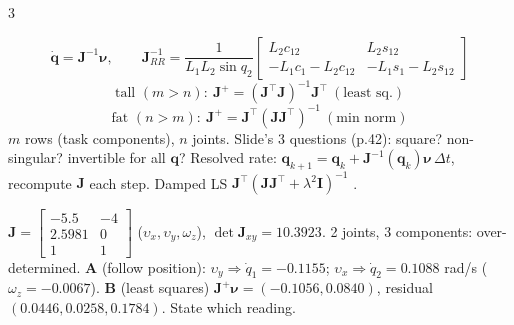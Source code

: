 \begin{multicols}{3}
\begin{fbx}
\[\dot{\mathbf q}=\mathbf J^{-1}\boldsymbol\nu,\qquad\mathbf J_{RR}^{-1}=\frac{1}{L_1L_2\sin q_2}\begin{bmatrix}L_2c_{12}&L_2s_{12}\\-L_1c_1-L_2c_{12}&-L_1s_1-L_2s_{12}\end{bmatrix}\]
\[\text{tall }(m>n):\ \mathbf J^+=(\mathbf J^\top\mathbf J)^{-1}\mathbf J^\top\ (\text{least sq.})\]
\[\text{fat }(n>m):\ \mathbf J^+=\mathbf J^\top(\mathbf J\mathbf J^\top)^{-1}\ (\text{min norm})\]
$m$ rows (task components), $n$ joints. Slide's 3 questions (p.42): square? non-singular? invertible for all $\mathbf q$? Resolved rate: $\mathbf q_{k+1}=\mathbf q_k+\mathbf J^{-1}(\mathbf q_k)\boldsymbol\nu\,\Delta t$, recompute $\mathbf J$ each step. Damped LS $\mathbf J^\top(\mathbf J\mathbf J^\top+\lambda^2\mathbf I)^{-1}$ \added.
\end{fbx}
\begin{worked}[notebook Q4: $L=(3,4)$, $\mathbf q=(30^\circ,60^\circ)$, $\boldsymbol\nu=(0.2,-0.3,-0.2)$]
$\mathbf J=\begin{bmatrix}-5.5&-4\\2.5981&0\\1&1\end{bmatrix}$ ($\upsilon_x,\upsilon_y,\omega_z$), $\det\mathbf J_{xy}=10.3923$. 2 joints, 3 components: over-determined. \textbf{A} (follow position): $\upsilon_y\Rightarrow\dot q_1=-0.1155$; $\upsilon_x\Rightarrow\dot q_2=0.1088$ rad/s ($\omega_z=-0.0067$). \textbf{B} (least squares) $\mathbf J^+\boldsymbol\nu=(-0.1056,0.0840)$, residual $(0.0446,0.0258,0.1784)$. State which reading. \chk
\end{worked}


\end{multicols}
